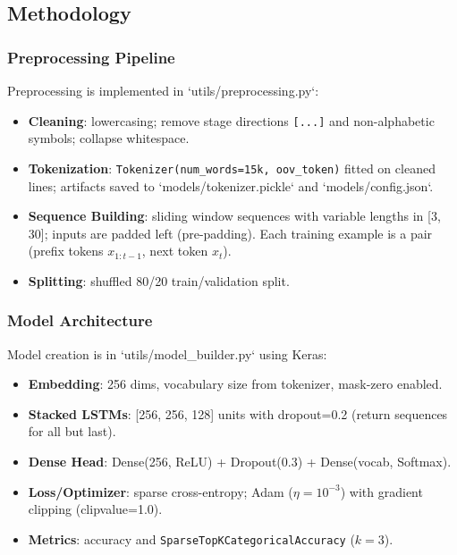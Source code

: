 \documentclass[12pt,a4paper]{article}
\begin{document}
\subsection{Methodology}

\subsubsection{Preprocessing Pipeline}

Preprocessing is implemented in `utils/preprocessing.py`:
\begin{itemize}
  \item \textbf{Cleaning}: lowercasing; remove stage directions \texttt{[...]} and non-alphabetic symbols; collapse whitespace.
  \item \textbf{Tokenization}: \texttt{Tokenizer(num\_words=15k, oov\_token)} fitted on cleaned lines; artifacts saved to `models/tokenizer.pickle` and `models/config.json`.
  \item \textbf{Sequence Building}: sliding window sequences with variable lengths in [3, 30]; inputs are padded left (pre-padding). Each training example is a pair (prefix tokens $x_{1:t-1}$, next token $x_t$).
  \item \textbf{Splitting}: shuffled 80/20 train/validation split.
\end{itemize}

\subsubsection{Model Architecture}

Model creation is in `utils/model_builder.py` using Keras:
\begin{itemize}
  \item \textbf{Embedding}: 256 dims, vocabulary size from tokenizer, mask-zero enabled.
  \item \textbf{Stacked LSTMs}: [256, 256, 128] units with dropout=0.2 (return sequences for all but last).
  \item \textbf{Dense Head}: Dense(256, ReLU) + Dropout(0.3) + Dense(vocab, Softmax).
  \item \textbf{Loss/Optimizer}: sparse cross-entropy; Adam ($\eta=10^{-3}$) with gradient clipping (clipvalue=1.0).
  \item \textbf{Metrics}: accuracy and \texttt{SparseTopKCategoricalAccuracy} ($k=3$).
\end{itemize}
\end{document}
